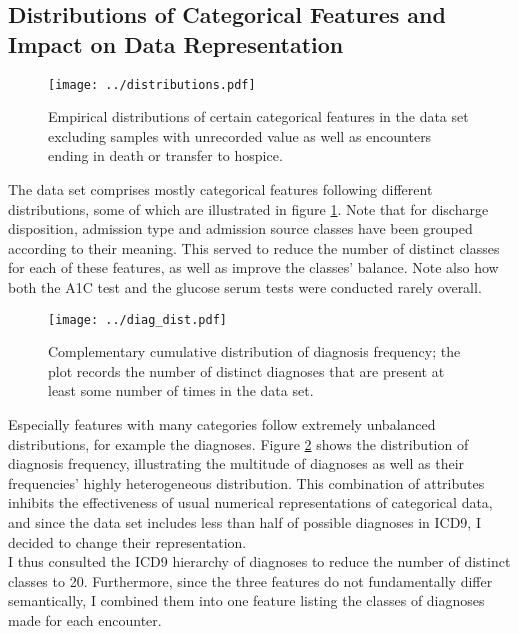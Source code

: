 \documentclass[10pt, twoside, a4paper]{article}
\begin{document}
	\subsection{Distributions of Categorical Features and Impact on Data Representation}
	
	\begin{figure}
		\texttt{[image: ../distributions.pdf]}
		\caption{Empirical distributions of certain categorical features in the data set 
		excluding samples with unrecorded value as well as encounters ending in death
		or transfer to hospice.}
		\label{figure:dists_cat_few_classes}
	\end{figure}

	The data set comprises mostly categorical features following different  
	distributions, some of which are illustrated in figure \ref{figure:dists_cat_few_classes}. 
	Note that for discharge disposition, admission type 
	and admission source classes have been grouped according to their meaning. 
	This served to reduce the number of distinct classes for each of these 
	features, as well as improve the classes' balance. Note also how 
	both the A1C test and the glucose serum tests  were conducted rarely overall. 

	\begin{figure}
	\texttt{[image: ../diag\_dist.pdf]}
	\caption{Complementary cumulative distribution of diagnosis frequency; the plot records the number of 
	distinct diagnoses that are present at least some number of times in the data set.}
	\label{figure:dist_diag}
	\end{figure}
	
	Especially features with many categories follow extremely unbalanced distributions, 
	for example the diagnoses. Figure \ref{figure:dist_diag} shows the distribution of diagnosis 
	frequency, illustrating the multitude of  
	diagnoses as well as their frequencies' highly heterogeneous distribution. This 
	combination of attributes inhibits the effectiveness of usual numerical representations of 
	categorical data, and since the data set includes less than half 
	of possible diagnoses in ICD9, I decided to change their representation.\\
	I thus consulted the ICD9 hierarchy of diagnoses to reduce the number of distinct 
	classes to  20. Furthermore, since the three features do not fundamentally differ 
	semantically, I combined them 
	into one feature listing the classes of diagnoses made for each encounter. 
\end{document}
